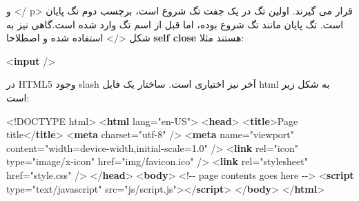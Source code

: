 \documentclass[
  persian,
  letterpaper,
  DIV=11,
  numbers=noendperiod]{scrreprt}
\newenvironment{Shaded}{\begin{snugshade}}{\end{snugshade}}
\newcommand{\CommentTok}[1]{\textcolor[rgb]{0.37,0.37,0.37}{#1}}
\newcommand{\DataTypeTok}[1]{\textcolor[rgb]{0.68,0.00,0.00}{#1}}
\newcommand{\KeywordTok}[1]{\textcolor[rgb]{0.00,0.23,0.31}{\textbf{#1}}}
\newcommand{\NormalTok}[1]{\textcolor[rgb]{0.00,0.23,0.31}{#1}}
\newcommand{\OperatorTok}[1]{\textcolor[rgb]{0.37,0.37,0.37}{#1}}
\newcommand{\OtherTok}[1]{\textcolor[rgb]{0.00,0.23,0.31}{#1}}
\newcommand{\StringTok}[1]{\textcolor[rgb]{0.13,0.47,0.30}{#1}}
\begin{document}
و \textless/ p\textgreater{} قرار می گیرند. اولین تگ در یک جفت تگ شروع
است، برچسب دوم تگ پایان است. تگ پایان مانند تگ شروع بوده، اما قبل از اسم
تگ وارد شده است.گاهی نیز به شکل \textless/\textgreater{} استفاده شده و
اصطلاحا \textbf{self close} هستند مثلا:

\begin{Shaded}
\begin{Highlighting}[]
\DataTypeTok{\textless{}}\KeywordTok{input}\OtherTok{ }\DataTypeTok{/\textgreater{}}
\end{Highlighting}
\end{Shaded}

در HTML5 وجود slash آخر نیز اختیاری است. ساختار یک فایل html به شکل زیر
است:

\begin{Shaded}
\begin{Highlighting}[]
\DataTypeTok{\textless{}!DOCTYPE}\NormalTok{ html}\DataTypeTok{\textgreater{}}
\DataTypeTok{\textless{}}\KeywordTok{html}\OtherTok{ lang}\OperatorTok{=}\StringTok{"en{-}US"}\DataTypeTok{\textgreater{}}
   \DataTypeTok{\textless{}}\KeywordTok{head}\DataTypeTok{\textgreater{}}
      \DataTypeTok{\textless{}}\KeywordTok{title}\DataTypeTok{\textgreater{}}\NormalTok{Page title}\DataTypeTok{\textless{}/}\KeywordTok{title}\DataTypeTok{\textgreater{}}
      \DataTypeTok{\textless{}}\KeywordTok{meta}\OtherTok{ charset}\OperatorTok{=}\StringTok{"utf{-}8"}\OtherTok{ }\DataTypeTok{/\textgreater{}}
      \DataTypeTok{\textless{}}\KeywordTok{meta}\OtherTok{ name}\OperatorTok{=}\StringTok{"viewport"}\OtherTok{ content}\OperatorTok{=}\StringTok{"width=device{-}width,initial{-}scale=1.0"}\OtherTok{ }\DataTypeTok{/\textgreater{}}
      \DataTypeTok{\textless{}}\KeywordTok{link}\OtherTok{ rel}\OperatorTok{=}\StringTok{"icon"}\OtherTok{ type}\OperatorTok{=}\StringTok{"image/x{-}icon"}\OtherTok{ href}\OperatorTok{=}\StringTok{"img/favicon.ico"}\OtherTok{ }\DataTypeTok{/\textgreater{}}
      \DataTypeTok{\textless{}}\KeywordTok{link}\OtherTok{ rel}\OperatorTok{=}\StringTok{"stylesheet"}\OtherTok{ href}\OperatorTok{=}\StringTok{"style.css"}\OtherTok{ }\DataTypeTok{/\textgreater{}}
   \DataTypeTok{\textless{}/}\KeywordTok{head}\DataTypeTok{\textgreater{}}
   \DataTypeTok{\textless{}}\KeywordTok{body}\DataTypeTok{\textgreater{}}
      \CommentTok{\textless{}!{-}{-} page contents goes here {-}{-}\textgreater{}}
      \DataTypeTok{\textless{}}\KeywordTok{script}\OtherTok{ type=}\StringTok{"text/javascript"}\OtherTok{ src}\OperatorTok{=}\StringTok{"js/script.js"}\DataTypeTok{\textgreater{}\textless{}/}\KeywordTok{script}\DataTypeTok{\textgreater{}}
   \DataTypeTok{\textless{}/}\KeywordTok{body}\DataTypeTok{\textgreater{}}
\DataTypeTok{\textless{}/}\KeywordTok{html}\DataTypeTok{\textgreater{}}
\end{Highlighting}
\end{Shaded}
\end{document}
